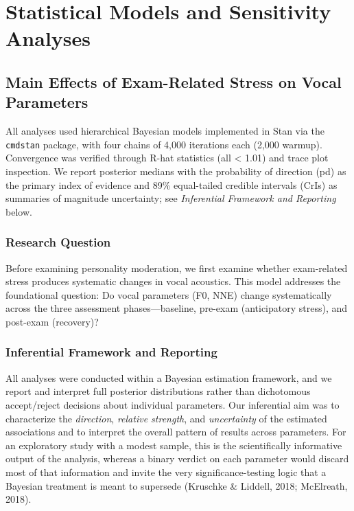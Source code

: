 \documentclass[
  english,
  man,floatsintext]{apa6}
\begin{document}
\newpage

\section{Statistical Models and Sensitivity Analyses}\label{s-statistical-models}

\subsection{Main Effects of Exam-Related Stress on Vocal Parameters}\label{main-effects-of-exam-related-stress-on-vocal-parameters}

All analyses used hierarchical Bayesian models implemented in Stan via the \texttt{cmdstan} package, with four chains of 4,000 iterations each (2,000 warmup). Convergence was verified through R-hat statistics (all \textless{} 1.01) and trace plot inspection. We report posterior medians with the probability of direction (pd) as the primary index of evidence and 89\% equal-tailed credible intervals (CrIs) as summaries of magnitude uncertainty; see \emph{Inferential Framework and Reporting} below.

\subsubsection{Research Question}\label{research-question}

Before examining personality moderation, we first examine whether exam-related stress produces systematic changes in vocal acoustics. This model addresses the foundational question: Do vocal parameters (F0, NNE) change systematically across the three assessment phases---baseline, pre-exam (anticipatory stress), and post-exam (recovery)?

\subsubsection{Inferential Framework and Reporting}\label{inferential-framework-and-reporting}

All analyses were conducted within a Bayesian estimation framework, and we report and
interpret full posterior distributions rather than dichotomous accept/reject decisions
about individual parameters. Our inferential aim was to characterize the \emph{direction},
\emph{relative strength}, and \emph{uncertainty} of the estimated associations and to interpret the
overall pattern of results across parameters. For an exploratory study with a modest
sample, this is the scientifically informative output of the analysis, whereas a binary
verdict on each parameter would discard most of that information and invite the very
significance-testing logic that a Bayesian treatment is meant to supersede
(Kruschke \& Liddell, 2018; McElreath, 2018).
\end{document}
